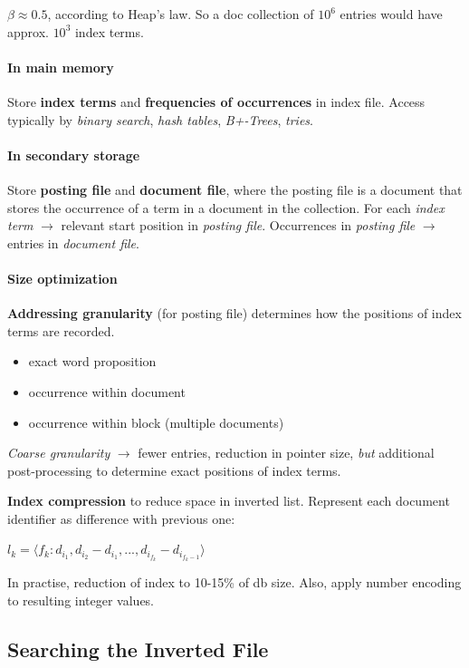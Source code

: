 $\beta \approx 0.5$, according to Heap's law. So a doc collection of $10^6$ entries would have approx. $10^3$ index terms.

\paragraph{In main memory} Store \textbf{index terms} and \textbf{frequencies of occurrences} in index file. Access typically by \emph{binary search}, \emph{hash tables}, \emph{B+-Trees}, \emph{tries}.
\paragraph{In secondary storage} Store \textbf{posting file} and \textbf{document file}, where the posting file is a document that stores the occurrence of a term in a document in the collection. For each \emph{index term} $\longrightarrow$ relevant start position in \emph{posting file}. Occurrences in \emph{posting file} $\longrightarrow$ entries in \emph{document file}.

\paragraph{Size optimization} \textbf{Addressing granularity} (for posting file) determines how the positions of index terms are recorded.
\begin{itemize}
  \item exact word proposition
  \item occurrence within document
  \item occurrence within block (multiple documents)
\end{itemize}
\emph{Coarse granularity} $\rightarrow$ fewer entries, reduction in pointer size, \emph{but} additional post-processing to determine exact positions of index terms.

\textbf{Index compression} to reduce space in inverted list. Represent each document identifier as difference with previous one:
\begin{center}
  $l_k = \langle f_k: d_{i_1}, d_{i_2} - d_{i_1}, ..., d_{i_{f_k}} - d_{i_{f_k - 1}} \rangle$
\end{center}
In practise, reduction of index to 10-15\% of db size. Also, apply number encoding to resulting integer values.

\subsection{Searching the Inverted File}

